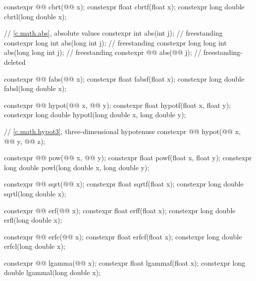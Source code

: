 \begin{codeblock}
{  constexpr @@ cbrt(@@ x);
  constexpr float               cbrtf(float x);
  constexpr long double         cbrtl(long double x);

  // \ref{c.math.abs}, absolute values
  constexpr int                 abs(int j);                             // freestanding
  constexpr long int            abs(long int j);                        // freestanding
  constexpr long long int       abs(long long int j);                   // freestanding
  constexpr @@ abs(@@ j);             // freestanding-deleted

  constexpr @@ fabs(@@ x);
  constexpr float               fabsf(float x);
  constexpr long double         fabsl(long double x);

  constexpr @@ hypot(@@ x, @@ y);
  constexpr float               hypotf(float x, float y);
  constexpr long double         hypotl(long double x, long double y);

  // \ref{c.math.hypot3}, three-dimensional hypotenuse
  constexpr @@ hypot(@@ x, @@ y,
                                      @@ z);

  constexpr @@ pow(@@ x, @@ y);
  constexpr float               powf(float x, float y);
  constexpr long double         powl(long double x, long double y);

  constexpr @@ sqrt(@@ x);
  constexpr float               sqrtf(float x);
  constexpr long double         sqrtl(long double x);

  constexpr @@ erf(@@ x);
  constexpr float               erff(float x);
  constexpr long double         erfl(long double x);

  constexpr @@ erfc(@@ x);
  constexpr float               erfcf(float x);
  constexpr long double         erfcl(long double x);

  constexpr @@ lgamma(@@ x);
  constexpr float               lgammaf(float x);
  constexpr long double         lgammal(long double x);

}
\end{codeblock}
